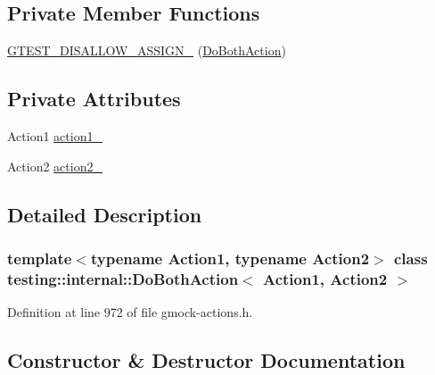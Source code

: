 \subsection*{Private Member Functions}
\begin{DoxyCompactItemize}
\item 
\hyperlink{classtesting_1_1internal_1_1DoBothAction_a3428a1598ba58759f1a3f7d4443d6490}{G\+T\+E\+S\+T\+\_\+\+D\+I\+S\+A\+L\+L\+O\+W\+\_\+\+A\+S\+S\+I\+G\+N\+\_\+} (\hyperlink{classtesting_1_1internal_1_1DoBothAction}{Do\+Both\+Action})
\end{DoxyCompactItemize}
\subsection*{Private Attributes}
\begin{DoxyCompactItemize}
\item 
Action1 \hyperlink{classtesting_1_1internal_1_1DoBothAction_af747366f4d0117d1058c6288bb152122}{action1\+\_\+}
\item 
Action2 \hyperlink{classtesting_1_1internal_1_1DoBothAction_a414a3fe2381da32b235524338bbb592e}{action2\+\_\+}
\end{DoxyCompactItemize}


\subsection{Detailed Description}
\subsubsection*{template$<$typename Action1, typename Action2$>$\newline
class testing\+::internal\+::\+Do\+Both\+Action$<$ Action1, Action2 $>$}



Definition at line 972 of file gmock-\/actions.\+h.



\subsection{Constructor \& Destructor Documentation}
\mbox{\label{classtesting_1_1internal_1_1DoBothAction_a55727c4dbdc1816ba6f1fe124e96088b}} 
